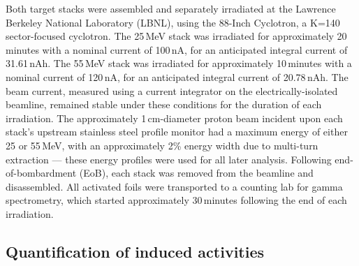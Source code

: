 Both target stacks were assembled and separately irradiated at the  Lawrence Berkeley National Laboratory  (LBNL), using the 88-Inch Cyclotron, a  K=140 sector-focused cyclotron.
The 25\,MeV stack was irradiated for approximately 20\,minutes with a nominal current of 100\,nA,  for an anticipated integral current of 31.61\,nAh. 
The 55\,MeV stack was irradiated for approximately 10\,minutes with a nominal current of 120\,nA,  for an anticipated integral current of 20.78\,nAh. 
The beam current, measured using a current integrator on the electrically-isolated beamline, remained stable under these conditions for the duration of each irradiation.
The approximately 1\,cm-diameter proton beam incident upon each stack's upstream stainless steel profile monitor had a maximum energy of either 25 or 55\,MeV, with an approximately 2\% energy width due to multi-turn extraction --- these energy profiles were used for all later analysis.
Following end-of-bombardment (EoB), each stack was removed from the beamline and disassembled.
All activated foils were transported to a counting lab for gamma spectrometry, which started approximately 30\,minutes following the end of each irradiation.





\subsection{\label{sec:spectroscopy_fe}Quantification of induced activities}


